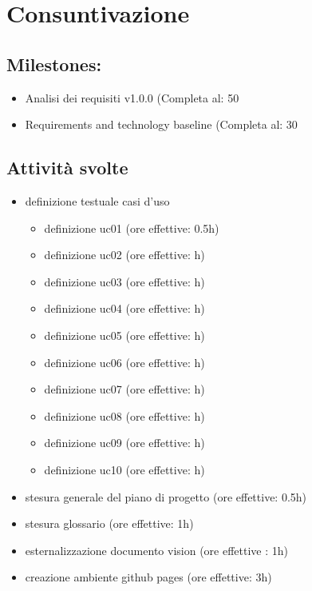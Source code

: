 \section{Consuntivazione}

\subsection{Milestones:}
\begin{itemize}
    \item Analisi dei requisiti v1.0.0 (Completa al: 50%
    \item Requirements and technology baseline (Completa al: 30%
\end{itemize}

\subsection{Attività svolte}

\begin{itemize}
    \item definizione testuale casi d'uso
    \begin{itemize}
        \item definizione uc01 (ore effettive: 0.5h)
        \item definizione uc02 (ore effettive: h)
        \item definizione uc03 (ore effettive: h)
        \item definizione uc04 (ore effettive: h)
        \item definizione uc05 (ore effettive: h)
        \item definizione uc06 (ore effettive: h)
        \item definizione uc07 (ore effettive: h)
        \item definizione uc08 (ore effettive: h)
        \item definizione uc09 (ore effettive: h)
        \item definizione uc10 (ore effettive: h)
    \end{itemize}
    \item stesura generale del piano di progetto (ore effettive: 0.5h)
    \item stesura glossario (ore effettive: 1h)
    \item esternalizzazione documento vision (ore effettive : 1h)
    \item creazione ambiente github pages (ore effettive: 3h)
\end{itemize}